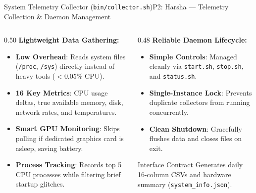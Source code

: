 \documentclass[aspectratio=169,10pt]{beamer}
\begin{document}
\begin{frame}{System Telemetry Collector (\texttt{bin/collector.sh})}{P2: Harsha --- Telemetry Collection \& Daemon Management}
\begin{columns}[T]
\begin{column}{0.50\textwidth}
\textbf{Lightweight Data Gathering:}
\begin{itemize}
    \item \textbf{Low Overhead}: Reads system files (\texttt{/proc}, \texttt{/sys}) directly instead of heavy tools ($<0.05\%$ CPU).
    \item \textbf{16 Key Metrics}: CPU usage deltas, true available memory, disk, network rates, and temperatures.
    \item \textbf{Smart GPU Monitoring}: Skips polling if dedicated graphics card is asleep, saving battery.
    \item \textbf{Process Tracking}: Records top 5 CPU processes while filtering brief startup glitches.
\end{itemize}
\end{column}

\begin{column}{0.48\textwidth}
\textbf{Reliable Daemon Lifecycle:}
\begin{itemize}
    \item \textbf{Simple Controls}: Managed cleanly via \texttt{start.sh}, \texttt{stop.sh}, and \texttt{status.sh}.
    \item \textbf{Single-Instance Lock}: Prevents duplicate collectors from running concurrently.
    \item \textbf{Clean Shutdown}: Gracefully flushes data and closes files on exit.
\end{itemize}

\vspace{0.3em}
\begin{block}{Interface Contract}
Generates daily 16-column CSVs and hardware summary (\texttt{system\_info.json}).
\end{block}
\end{column}
\end{columns}
\end{frame}
\end{document}
